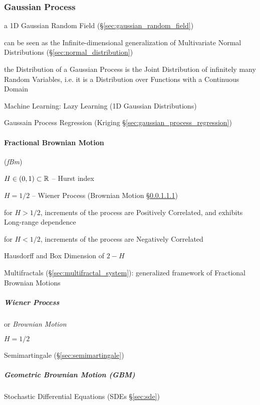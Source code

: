 \subsubsection{Gaussian Process}\label{sec:gaussian_process}

a 1D Gaussian Random Field (\S\ref{sec:gaussian_random_field})

can be seen as the Infinite-dimensional generalization of Multivariate Normal
Distributions (\S\ref{sec:normal_distribution})

the Distribution of a Gaussian Process is the Joint Distribution of infinitely
many Random Variables, i.e. it is a Distribution over Functions with a
Continuous Domain

Machine Learning: Lazy Learning (1D Gaussian Distributions)

Gaussain Process Regression (Kriging \S\ref{sec:gaussian_process_regression})



\paragraph{Fractional Brownian Motion}\label{sec:fractional_brownian}\hfill

(\emph{fBm})

$H \in (0,1) \subset \mathbb{R}$ -- Hurst index

$H = 1/2$ -- Wiener Process (Brownian Motion \S\ref{sec:wiener_process})

for $H > 1/2$, increments of the process are Positively Correlated, and exhibits
Long-range dependence

for $H < 1/2$, increments of the process are Negatively Correlated

Hausdorff and Box Dimension of $2 - H$

\fist Multifractals (\S\ref{sec:multifractal_system}): generalized framework of
Fractional Brownian Motions



\subparagraph{Wiener Process}\label{sec:wiener_process}\hfill

or \emph{Brownian Motion}

$H = 1/2$

Semimartingale (\S\ref{sec:semimartingale})



\subparagraph{Geometric Brownian Motion (GBM)}\label{sec:gbm}\hfill

Stochastic Differential Equations (SDEs \S\ref{sec:sde})

